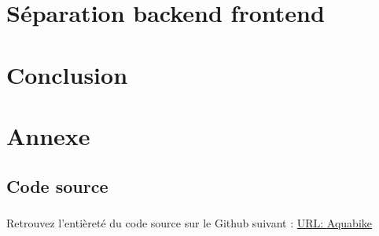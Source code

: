\documentclass[12pt,oneside]{report}
\newcommand{\Href}[2]{\href{#1}{URL: \underline{#2}}}
\begin{document}
\chapter{Séparation backend frontend}
\label{chap:Séparation backend frontend}

	\vspace{\baselineskip}
	

\chapter{Conclusion}
\label{chap:Conclusion}

	\vspace{\baselineskip}
	

\newpage
\chapter{Annexe}
	 \label{chap:Annexe}
	
	\vspace{\baselineskip}
	\section{Code source}
		\paragraph{}
			Retrouvez l'entièreté du code source sur le Github suivant : \Href{https://github.com/victorsmits/Aquabike}{Aquabike}
			
\end{document}
